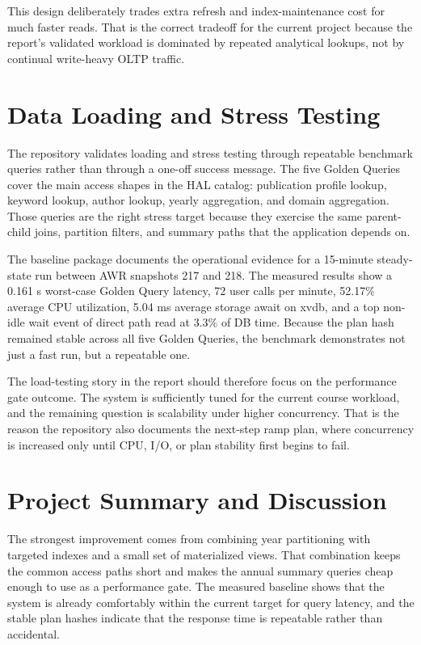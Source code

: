 \documentclass[conference]{IEEEtran}
\begin{document}
This design deliberately trades extra refresh and index-maintenance cost for much faster reads. That is the correct tradeoff for the current project because the report's validated workload is dominated by repeated analytical lookups, not by continual write-heavy OLTP traffic.

\section{Data Loading and Stress Testing}
The repository validates loading and stress testing through repeatable benchmark queries rather than through a one-off success message. The five Golden Queries cover the main access shapes in the HAL catalog: publication profile lookup, keyword lookup, author lookup, yearly aggregation, and domain aggregation. Those queries are the right stress target because they exercise the same parent-child joins, partition filters, and summary paths that the application depends on.

The baseline package documents the operational evidence for a 15-minute steady-state run between AWR snapshots 217 and 218. The measured results show a 0.161 s worst-case Golden Query latency, 72 user calls per minute, 52.17\% average CPU utilization, 5.04 ms average storage await on xvdb, and a top non-idle wait event of direct path read at 3.3\% of DB time. Because the plan hash remained stable across all five Golden Queries, the benchmark demonstrates not just a fast run, but a repeatable one.

The load-testing story in the report should therefore focus on the performance gate outcome. The system is sufficiently tuned for the current course workload, and the remaining question is scalability under higher concurrency. That is the reason the repository also documents the next-step ramp plan, where concurrency is increased only until CPU, I/O, or plan stability first begins to fail.
\section{Project Summary and Discussion}
The strongest improvement comes from combining year partitioning with targeted indexes and a small set of materialized views. That combination keeps the common access paths short and makes the annual summary queries cheap enough to use as a performance gate. The measured baseline shows that the system is already comfortably within the current target for query latency, and the stable plan hashes indicate that the response time is repeatable rather than accidental.
\end{document}
